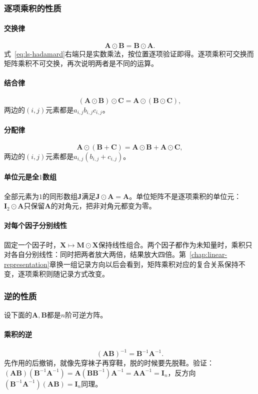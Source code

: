 \subsubsection{逐项乘积的性质}

\paragraph{交换律}
\[
 \bm A\odot\bm B=\bm B\odot\bm A.
\]
式~\eqref{eq:ls-hadamard}右端只是实数乘法，按位置逐项验证即得。逐项乘积可交换而矩阵乘积不可交换，再次说明两者是不同的运算。

\paragraph{结合律}
\[
 (\bm A\odot\bm B)\odot\bm C=\bm A\odot(\bm B\odot\bm C),
\]
两边的$(i,j)$元素都是$a_{i,j}b_{i,j}c_{i,j}$。

\paragraph{分配律}
\[
 \bm A\odot(\bm B+\bm C)=\bm A\odot\bm B+\bm A\odot\bm C,
\]
两边的$(i,j)$元素都是$a_{i,j}(b_{i,j}+c_{i,j})$。

\paragraph{单位元是全$1$数组}
全部元素为$1$的同形数组$\bm J$满足$\bm J\odot\bm A=\bm A$。单位矩阵不是逐项乘积的单位元：$\bm I_2\odot\bm A$只保留$\bm A$的对角元，把非对角元都变为零。

\paragraph{对每个因子分别线性}
固定一个因子时，$\bm X\mapsto\bm M\odot\bm X$保持线性组合。两个因子都作为未知量时，乘积只对各自分别线性：同时把两者放大两倍，结果放大四倍。第~\ref{chap:linear-representation}章换一组记录方向以后会看到，矩阵乘积对应的复合关系保持不变，逐项乘积则随记录方式改变。

\subsubsection{逆的性质}

设下面的$\bm A,\bm B$都是$n$阶可逆方阵。

\paragraph{乘积的逆}
\begin{equation}
 (\bm A\bm B)^{-1}=\bm B^{-1}\bm A^{-1}.
 \label{eq:ls-inverse-product}
\end{equation}
先作用的后撤销，就像先穿袜子再穿鞋，脱的时候要先脱鞋。验证：$(\bm A\bm B)(\bm B^{-1}\bm A^{-1})=\bm A(\bm B\bm B^{-1})\bm A^{-1}=\bm A\bm A^{-1}=\bm I_n$，反方向$(\bm B^{-1}\bm A^{-1})(\bm A\bm B)=\bm I_n$同理。

